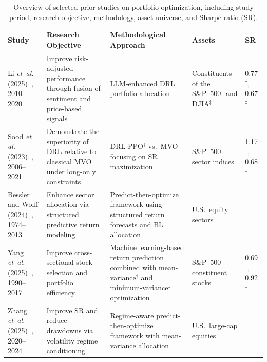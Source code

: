 \begin{table}[ht]
\centering
\caption{Overview of selected prior studies on portfolio optimization, including study period, research objective, methodology, asset universe, and Sharpe ratio (SR).}
\label{tab:literature_review}
\begin{tabular}{|>{\centering\arraybackslash}m{2cm}|
                >{\centering\arraybackslash}m{4.2cm}|
                >{\centering\arraybackslash}m{4cm}|
                >{\centering\arraybackslash}m{2cm}|
                >{\centering\arraybackslash}m{1cm}|}
\hline
\textbf{Study} & \textbf{Research Objective} &  \textbf{Methodological Approach} & \textbf{Assets} & \textbf{SR}  \\
\hline

Li \emph{et~al.} (2025)~\cite{de270}, 2010--2020
  & Improve risk-adjusted performance through fusion of sentiment and price-based signals
  & LLM-enhanced DRL portfolio allocation
  & Constituents of the S\&P~500$^{\dagger}$ and DJIA$^{\ddagger}$
  & \makecell{0.77$^{\dagger}$,\\0.67$^{\ddagger}$} \\
\hline

Sood \emph{et al.} (2023)~\cite{0df79}, 2006--2021
  & Demonstrate the superiority of DRL relative to classical MVO under long-only constraints
  & DRL-PPO$^{\dagger}$ vs.\ MVO$^{\ddagger}$ focusing on SR maximization
  & S\&P~500 sector indices
  & \makecell{1.17$^{\dagger}$,\\0.68$^{\ddagger}$} \\
\hline

Bessler and Wolff (2024)~\cite{83780}, 1974--2013
  & Enhance sector allocation via structured predictive return modeling
  & Predict-then-optimize framework using structured return forecasts and BL allocation
  & 6 U.S.\ equity sectors
  & 1.03 \\
\hline

Yang \emph{et~al.} (2025)~\cite{4061c}, 1990--2017
  & Improve cross-sectional stock selection and portfolio efficiency
  & Machine learning-based return prediction combined with mean-variance$^{\dagger}$ and minimum-variance$^{\ddagger}$ optimization
  & S\&P~500 constituent stocks
  & \makecell{0.69$^{\dagger}$,\\ 0.92$^{\ddagger}$} \\
\hline

Zhang \emph{et~al.} (2025)~\cite{4e332}, 2020--2024
  & Improve SR and reduce drawdowns via volatility regime conditioning
  & Regime-aware predict-then-optimize framework with mean-variance allocation
  & 34 U.S.\ large-cap equities
  & 1.17 \\
\hline


\end{tabular}
\end{table}
